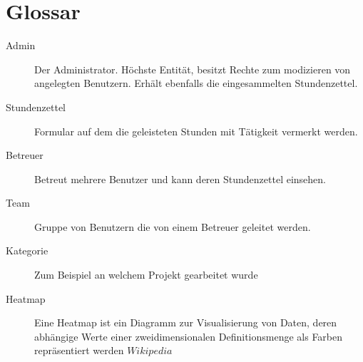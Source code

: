 \section{Glossar}
\begin{description}
	\item[Admin] Der Administrator. Höchste Entität, besitzt Rechte zum modizieren von angelegten Benutzern.
	               Erhält ebenfalls die eingesammelten Stundenzettel.

	\item[Stundenzettel] Formular auf dem die geleisteten Stunden mit Tätigkeit vermerkt werden.

	\item[Betreuer] Betreut mehrere Benutzer und kann deren Stundenzettel einsehen.

	\item[Team] Gruppe von Benutzern die von einem Betreuer geleitet werden.

	\item[Kategorie] Zum Beispiel an welchem Projekt gearbeitet wurde

	\item[Heatmap] Eine Heatmap ist ein Diagramm zur Visualisierung von Daten, deren abhängige Werte einer zweidimensionalen Definitionsmenge als Farben repräsentiert werden \(Wikipedia\)
\end{description}
